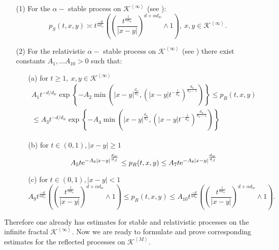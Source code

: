 \documentclass[11pt]{article}
\begin{document}
\begin{enumerate}
\item[(1)] For the $\alpha-$ stable process on $\mathcal{K}^{\left\langle \infty \right\rangle}$ (see \cite{bib:BSS}):
\begin{equation}\label{eq:stos-stable}
p_S(t,x,y)  \asymp  t^{\frac{-d}{\alpha d_{w}}}\left(\left(\frac{t^{\frac{1}{\alpha d_{w}}}}{|x-y|}\right)^{d +\alpha d_{w}} \wedge 1\right),  \ x,y \in \mathcal{K}^{\left\langle \infty \right\rangle}.
\end{equation}
\item[(2)] For the relativistic $\alpha-$ stable process on $\mathcal{K}^{\left\langle \infty \right\rangle}$ (see \cite{bib:Bal-Kpp}) there exist constants $A_1, \ldots A_{10} > 0$ such that:
\begin{itemize}
\item[(a)] for $t \geq 1,  \ x,y \in \mathcal{K}^{\left\langle \infty \right\rangle}$
\begin{multline}\label{eq:p_r_t_geq_1}
A_1t^{-d/d_w} \exp\left\{-A_2\min\left(|x-y|^{\frac{d_{w}}{d_{J}}},\left({|x-y|}{t^{-\frac{1}{d_w}}}\right)^{\frac{d_{w}}{d_{J}-1}}\right)\right\} \leq p_R(t,x,y)\\
 \leq A_3t^{-d/d_w} \exp\left\{-A_4\min\left(|x-y|^{\frac{d_{w}}{d_{J}}},\left({|x-y|}{t^{-\frac{1}{d_w}}}\right)^{\frac{d_{w}}{d_{J}-1}}\right)\right\}
\end{multline}
\item[(b)] for $t \in (0,1), |x-y| \geq 1$
\begin{equation}\label{eq:p_r_t_leq_1}
A_5t{\rm e}^{-A_6|x-y|^{\frac{d_{w}}{d_{J}}}} \leq p_R(t,x,y) \leq A_7t{\rm e}^{-A_8|x-y|^{\frac{d_{w}}{d_{J}}}}
\end{equation}
\item[(c)] for $t \in (0,1), |x-y| < 1$
\begin{equation}\label{eq:p_r_t_geq_1_dxy_leq_1}
A_9t^{\frac{-d}{\alpha d_{w}}}\left(\left(\frac{t^{\frac{1}{\alpha d_{w}}}}{|x-y|}\right)^{d +\alpha d_{w}} \wedge 1\right) \leq p_R(t,x,y) \leq A_{10}
 t^{\frac{-d}{\alpha d_{w}}}\left(\left(\frac{t^{\frac{1}{\alpha d_{w}}}}{|x-y|}\right)^{d +\alpha d_{w}} \wedge 1\right).
\end{equation}
\end{itemize}
\end{enumerate}
Therefore one already has estimates for stable and relativistic processes on the infinite fractal $\mathcal{K}^{\left\langle \infty \right\rangle}.$
Now we are ready to formulate and prove corresponding estimates for the reflected processes on $\mathcal{K}^{\left\langle M \right\rangle}$.
\noindent
\end{document}
